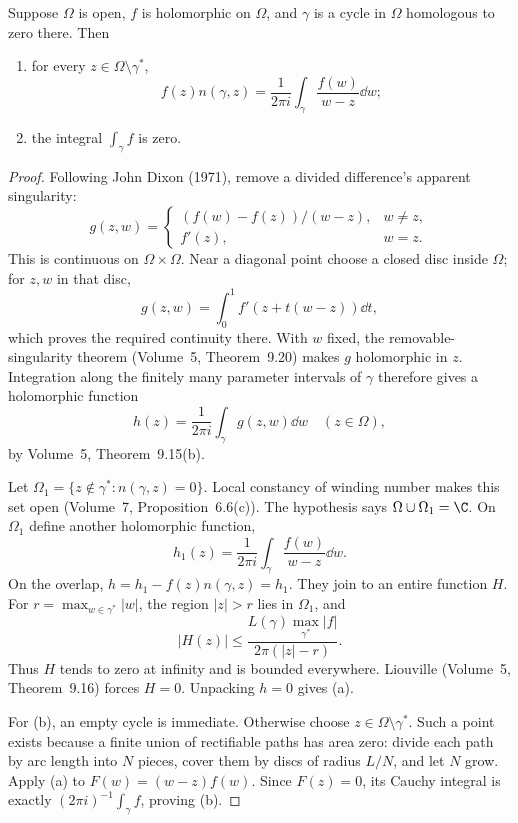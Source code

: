 \begin{theorem}\label{thm:globalcauchy}
Suppose $\Omega$ is open, $f$ is holomorphic on $\Omega$, and $\gamma$ is a cycle in $\Omega$ homologous to zero there. Then
\begin{enumerate}
\item[(a)] for every $z\in\Omega\setminus\gamma^*$,
\[f(z)n(\gamma,z)=\frac1{2\pi i}\int_\gamma\frac{f(w)}{w-z}\dd w;\]
\item[(b)] the integral $\int_\gamma f$ is zero.
\end{enumerate}
\end{theorem}
\begin{proof}
Following John Dixon (1971), remove a divided difference's apparent singularity:
\[g(z,w)=\begin{cases}(f(w)-f(z))/(w-z),&w\ne z,\\f'(z),&w=z.\end{cases}\]
This is continuous on $\Omega\times\Omega$. Near a diagonal point choose a closed disc inside $\Omega$; for $z,w$ in that disc,
\[g(z,w)=\int_0^1 f'(z+t(w-z))\dd t,\]
which proves the required continuity there. With $w$ fixed, the removable-singularity theorem (Volume~5, Theorem~9.20) makes $g$ holomorphic in $z$. Integration along the finitely many parameter intervals of $\gamma$ therefore gives a holomorphic function
\[h(z)=\frac1{2\pi i}\int_\gamma g(z,w)\dd w\quad(z\in\Omega),\]
by Volume~5, Theorem~9.15(b).

Let $\Omega_1=\{z\notin\gamma^*:n(\gamma,z)=0\}$. Local constancy of winding number makes this set open (Volume~7, Proposition~6.6(c)). The hypothesis says $\Omega\cup\Omega_1=\C$. On $\Omega_1$ define another holomorphic function,
\[h_1(z)=\frac1{2\pi i}\int_\gamma\frac{f(w)}{w-z}\dd w.\]
On the overlap, $h=h_1-f(z)n(\gamma,z)=h_1$. They join to an entire function $H$. For $r=\max_{w\in\gamma^*}|w|$, the region $|z|>r$ lies in $\Omega_1$, and
\[|H(z)|\le\frac{L(\gamma)\max_{\gamma^*}|f|}{2\pi(|z|-r)}.\]
Thus $H$ tends to zero at infinity and is bounded everywhere. Liouville (Volume~5, Theorem~9.16) forces $H=0$. Unpacking $h=0$ gives (a).

For (b), an empty cycle is immediate. Otherwise choose $z\in\Omega\setminus\gamma^*$. Such a point exists because a finite union of rectifiable paths has area zero: divide each path by arc length into $N$ pieces, cover them by discs of radius $L/N$, and let $N$ grow. Apply (a) to $F(w)=(w-z)f(w)$. Since $F(z)=0$, its Cauchy integral is exactly $(2\pi i)^{-1}\int_\gamma f$, proving (b).
\end{proof}

